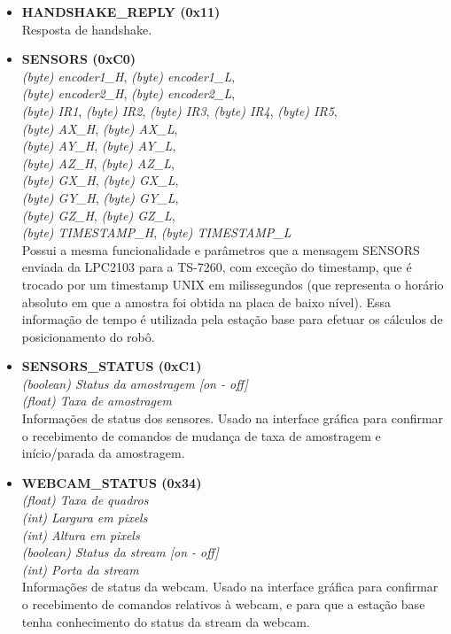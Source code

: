 \begin{itemize}
    \begin{itemize}
      \item \textbf{HANDSHAKE\_REPLY (0x11)}\\
	Resposta de handshake.
	
	 \item \textbf{SENSORS (0xC0)}\\
	  \textit{(byte) encoder1\_H}, \textit{(byte) encoder1\_L},\\
	  \textit{(byte) encoder2\_H}, \textit{(byte) encoder2\_L},\\
	  \textit{(byte) IR1}, \textit{(byte) IR2}, \textit{(byte) IR3}, \textit{(byte) IR4}, \textit{(byte) IR5},\\
	  \textit{(byte) AX\_H}, \textit{(byte) AX\_L},\\
	  \textit{(byte) AY\_H}, \textit{(byte) AY\_L},\\
	  \textit{(byte) AZ\_H}, \textit{(byte) AZ\_L},\\
	  \textit{(byte) GX\_H}, \textit{(byte) GX\_L},\\
	  \textit{(byte) GY\_H}, \textit{(byte) GY\_L},\\
	  \textit{(byte) GZ\_H}, \textit{(byte) GZ\_L},\\
	  \textit{(byte) TIMESTAMP\_H}, \textit{(byte) TIMESTAMP\_L}\\
	  
	  Possui a mesma funcionalidade e parâmetros que a mensagem SENSORS enviada da LPC2103 para a TS-7260, com exceção do timestamp, que é trocado por um timestamp UNIX em milissegundos (que representa o horário absoluto em que a amostra foi obtida na placa de baixo nível). Essa informação de tempo é utilizada pela estação base para efetuar os cálculos de posicionamento do robô.

      \item \textbf{SENSORS\_STATUS (0xC1)} \\
	\textit{(boolean) Status da amostragem [on - off] }\\
	\textit{(float) Taxa de amostragem}\\
	Informações de status dos sensores. Usado na interface gráfica para confirmar o recebimento de comandos de mudança de taxa de amostragem e início/parada da amostragem.

      \item \textbf{WEBCAM\_STATUS (0x34)} \\
	\textit{(float) Taxa de quadros }\\
	\textit{(int) Largura em pixels }\\
	\textit{(int) Altura em pixels }\\
	\textit{(boolean) Status da stream [on - off] }\\
	\textit{(int) Porta da stream}\\
	Informações de status da webcam. Usado na interface gráfica para confirmar o recebimento de comandos relativos à webcam, e para que a estação base tenha conhecimento do status da stream da webcam.
	

\end{itemize}
\end{itemize}
